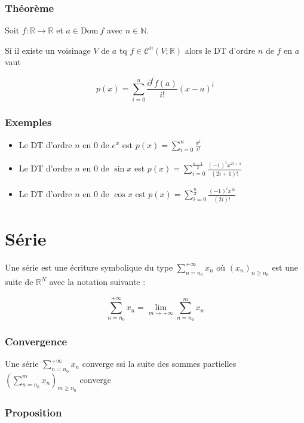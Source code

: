 \documentclass[a4paper,10pt]{article}
\newcommand{\ap}{\rightarrow}
\newcommand{\Dom}{\mathrm{Dom}\:}
\newcommand{\R}{\mathbb{R}}
\newcommand{\N}{\mathbb{N}}
\newcommand{\clim}[1]{\lim\limits_{#1}}
\newcommand{\cclass}[3]{\mathcal{C}^{#1} (#2;#3)}
\begin{document}
\subsubsection{Théorème}

Soit $f : \R \ap \R$ et $a \in \Dom f$ avec $n \in \N$.

Si il existe un voisinage $V$ de $a$ tq $f \in \cclass{n}{V}{\R}$ alors le DT d'ordre $n$ de $f$ en $a$ vaut 

$$p(x) = \sum_{i=0}^n \frac{\partial^i f(a)}{i!} \left( x-a \right)^i$$

\subsubsection{Exemples}

\begin{itemize}
	\item{Le DT d'ordre $n$ en $0$ de $e^x$ est $\displaystyle p(x) = \sum_{i=0}^n \frac{x^i}{i!}$}
	\item{Le DT d'ordre $n$ en $0$ de $\sin x$ est $\displaystyle p(x) = \sum_{i=0}^{\frac{n-1}{2}} \frac{(-1)^i x^{2 i + 1}}{(2 i + 1)!}$}
	\item{Le DT d'ordre $n$ en $0$ de $\cos x$ est $\displaystyle p(x) = \sum_{i=0}^{\frac{n}{2}} \frac{(-1)^i x^{2 i}}{(2i)!}$}
\end{itemize}

\section{Série}

Une série est une écriture symbolique du type $\sum_{n=n_0}^{+\infty} x_n$ où $(x_n)_{n \geq n_0}$ est une suite de $\R^N$ avec la notation suivante :

$$\sum_{n=n_0}^{+\infty} x_n = \clim{m \ap + \infty} \sum_{n=n_0}^m x_n$$

\subsubsection{Convergence}

Une série $\sum_{n=n_0}^{+\infty} x_n$ converge ssi la suite des sommes partielles $\left( \sum_{n = n_0}^m x_n \right)_{m \geq n_0}$ converge

\subsubsection{Proposition}
\end{document}
